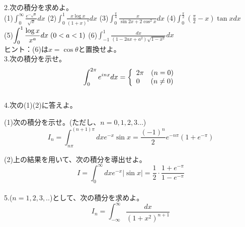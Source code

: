 \documentclass[a4j,dvipdfmx]{jsarticle}
\begin{document}
2.次の積分を求めよ。\\

(1)$\displaystyle \int_0^\infty \frac{e^{-\sqrt{x}}}{\sqrt{x}}dx$
\hspace{17mm}
(2)$\displaystyle \int_0^1 \frac{x\log x}{(1+x)^4}dx$
\hspace{10mm}
(3)$\displaystyle \int_0^\frac{\pi}{4}\frac{x}{\sin 2x+2\cos^2 x}dx$
\hspace{10mm}
(4)$\displaystyle \int_0^\frac{\pi}{2} \left(\frac{\pi}{2}-x\right)\tan xdx$\\

(5)$\displaystyle \int_0^1\frac{\log x}{x^{a}}dx\hspace{1mm}(0<a<1)$
\hspace{0.5mm}
(6)$\displaystyle \int_{-1}^1 \frac{dx}{(1-2ax+a^2)\sqrt{1-x^2}}dx$\\

{\scriptsize ヒント：(6)は$x=\cos\theta$と置換せよ。}\\

3.次の積分を示せ。
\begin{equation*}
    \int_0^{2\pi}e^{inx}dx=\left \{
        \begin{array}{l}
            2\pi\quad(n=0)\\
            0 \quad\hspace{2mm}(n\neq 0)
        \end{array}
    \right.
\end{equation*}\\

4.次の(1)(2)に答えよ。

(1)次の積分を示せ。(ただし、$n=0,1,2,3...$)
\begin{equation*}
    I_n=\int_{n\pi}^{(n+1)\pi}dx e^{-x}\sin x=\frac{(-1)^n}{2}e^{-n\pi}(1+e^{-\pi})
\end{equation*}

(2)上の結果を用いて、次の積分を導出せよ。
\begin{equation*}
    I=\int_0^\infty dx e^{-x}|\sin x|=\frac{1}{2}\cdot \frac{1+e^{-\pi}}{1-e^{-\pi}}
\end{equation*}\\

5.($n=1,2,3,..$)として、次の積分を求めよ。
\begin{equation*}
    I_n=\int_{-\infty}^{\infty}\frac{dx}{(1+x^2)^{n+1}}
\end{equation*}\\
\end{document}

